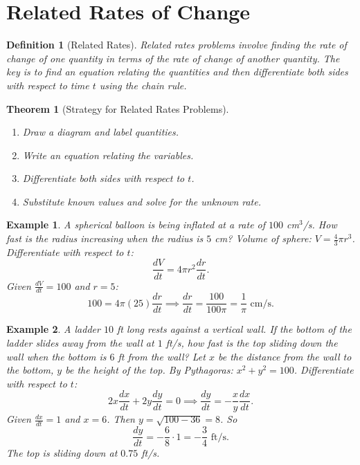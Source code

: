 \documentclass[11pt,a4paper]{article}
\newtheorem{example}{Example}
\newtheorem{theorem}{Theorem}
\newtheorem{definition}{Definition}
\begin{document}
\section{Related Rates of Change}
\begin{definition}[Related Rates]
\textit{Related rates} problems involve finding the rate of change of one quantity in terms of the rate of change of another quantity. The key is to find an equation relating the quantities and then differentiate both sides with respect to time $t$ using the chain rule.
\end{definition}
\begin{theorem}[Strategy for Related Rates Problems]
\begin{enumerate}
\item Draw a diagram and label quantities.
\item Write an equation relating the variables.
\item Differentiate both sides with respect to $t$.
\item Substitute known values and solve for the unknown rate.
\end{enumerate}
\end{theorem}
\begin{example}
A spherical balloon is being inflated at a rate of $100$ cm$^3$/s. How fast is the radius increasing when the radius is $5$ cm?
Volume of sphere: $V = \frac{4}{3}\pi r^3$. Differentiate with respect to $t$:
\[
\frac{dV}{dt} = 4\pi r^2 \frac{dr}{dt}.
\]
Given $\frac{dV}{dt} = 100$ and $r = 5$:
\[
100 = 4\pi (25) \frac{dr}{dt} \implies \frac{dr}{dt} = \frac{100}{100\pi} = \frac{1}{\pi} \text{ cm/s}.
\]
\end{example}
\begin{example}
A ladder $10$ ft long rests against a vertical wall. If the bottom of the ladder slides away from the wall at $1$ ft/s, how fast is the top sliding down the wall when the bottom is $6$ ft from the wall?
Let $x$ be the distance from the wall to the bottom, $y$ be the height of the top. By Pythagoras: $x^2 + y^2 = 100$. Differentiate with respect to $t$:
\[
2x \frac{dx}{dt} + 2y \frac{dy}{dt} = 0 \implies \frac{dy}{dt} = -\frac{x}{y} \frac{dx}{dt}.
\]
Given $\frac{dx}{dt} = 1$ and $x = 6$. Then $y = \sqrt{100 - 36} = 8$. So
\[
\frac{dy}{dt} = -\frac{6}{8} \cdot 1 = -\frac{3}{4} \text{ ft/s}.
\]
The top is sliding down at $0.75$ ft/s.
\end{example}
\end{document}
